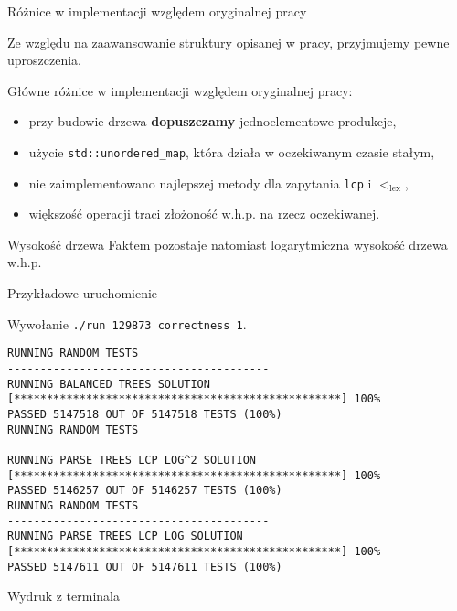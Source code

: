 \documentclass[polish]{beamer}
\begin{document}
\begin{frame}{Różnice w implementacji względem oryginalnej pracy}
    \begin{alertblock}{}
        Ze względu na zaawansowanie struktury opisanej w pracy, przyjmujemy pewne uproszczenia.
    \end{alertblock}
    \pause
    Główne różnice w implementacji względem oryginalnej pracy:
    \begin{itemize}
        \item przy budowie drzewa \textbf{dopuszczamy} jednoelementowe produkcje, \pause
        \item użycie \texttt{std::unordered\_map}, która działa w oczekiwanym czasie stałym, \pause
        \item nie zaimplementowano najlepszej metody dla zapytania  \texttt{lcp} i $<_{\text{lex}}$, \pause
        \item większość operacji traci złożoność w.h.p. na rzecz oczekiwanej.
    \end{itemize}
    \pause
    \begin{block}{Wysokość drzewa}
        Faktem pozostaje natomiast logarytmiczna wysokość drzewa w.h.p.
    \end{block}
\end{frame}

\begin{frame}[fragile]{Przykładowe uruchomienie}
    \begin{example}
    Wywołanie \texttt{./run 129873 correctness 1}.
    \end{example}

\begin{lrbox}{\fourthbox}
    \begin{lstlisting}[basicstyle=\tiny,frame=single,linewidth=8cm]
RUNNING RANDOM TESTS
----------------------------------------
RUNNING BALANCED TREES SOLUTION
[**************************************************] 100%
PASSED 5147518 OUT OF 5147518 TESTS (100%)
RUNNING RANDOM TESTS
----------------------------------------
RUNNING PARSE TREES LCP LOG^2 SOLUTION
[**************************************************] 100%
PASSED 5146257 OUT OF 5146257 TESTS (100%)
RUNNING RANDOM TESTS
----------------------------------------
RUNNING PARSE TREES LCP LOG SOLUTION
[**************************************************] 100%
PASSED 5147611 OUT OF 5147611 TESTS (100%)
    \end{lstlisting}
\end{lrbox}
\begin{alertblock}{Wydruk z terminala}
\begin{center}
    \vskip 2mm
    \scalebox{1.2}{\usebox{\fourthbox}}
\end{center}
\end{alertblock}
\end{frame}
\end{document}
